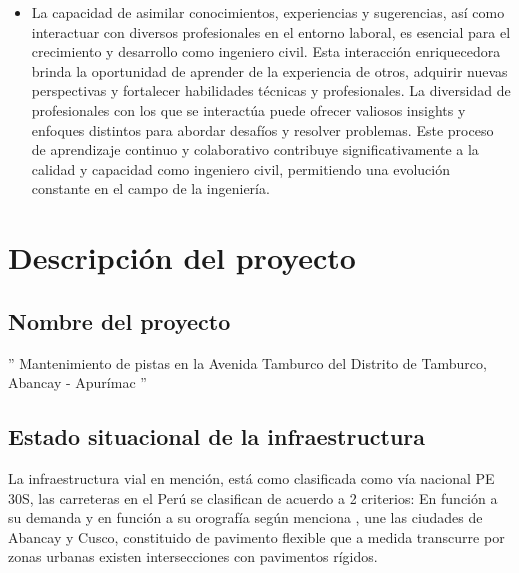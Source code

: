\begin{itemize}
	\item La capacidad de asimilar conocimientos, experiencias y sugerencias, así como interactuar con diversos profesionales en el entorno laboral, es esencial para el crecimiento y desarrollo como ingeniero civil. Esta interacción enriquecedora brinda la oportunidad de aprender de la experiencia de otros, adquirir nuevas perspectivas y fortalecer habilidades técnicas y profesionales. La diversidad de profesionales con los que se interactúa puede ofrecer valiosos insights y enfoques distintos para abordar desafíos y resolver problemas. Este proceso de aprendizaje continuo y colaborativo contribuye significativamente a la calidad y capacidad como ingeniero civil, permitiendo una evolución constante en el campo de la ingeniería.
\end{itemize}

\section{Descripción del proyecto}
\subsection{Nombre del proyecto}
'' Mantenimiento de pistas en la Avenida Tamburco del Distrito de Tamburco, Abancay - Apurímac ''
\subsection{Estado situacional de la infraestructura}
La infraestructura vial en mención, está como clasificada como vía nacional  PE 30S, las carreteras en el Perú se clasifican de acuerdo a 2 criterios: En función a su demanda y en función a su orografía según menciona \cite[12]{MTC2018}, une las ciudades de Abancay y Cusco, constituido de pavimento flexible que a medida transcurre por zonas urbanas existen intersecciones con pavimentos rígidos.

